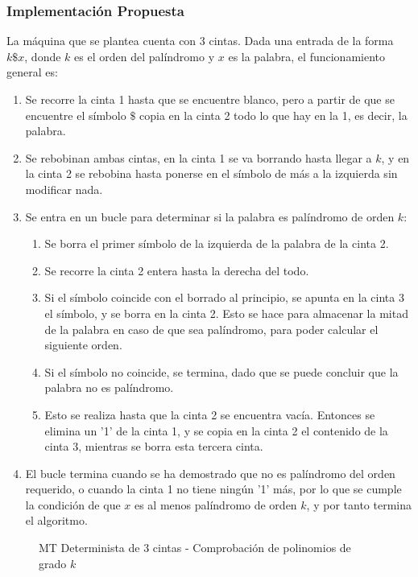 \documentclass{uc3mpracticas}
\begin{document}
  \subsubsection{Implementación Propuesta}

  La máquina que se plantea cuenta con 3 cintas. Dada una entrada de la forma $ k\$x $, donde $k$ es el orden del palíndromo y $x$ es la palabra, el funcionamiento general es:
    \begin{enumerate}
      \item Se recorre la cinta 1 hasta que se encuentre blanco, pero a partir de que se encuentre el símbolo $\$$ copia en la cinta 2 todo lo que hay en la 1, es decir, la palabra.
      \item Se rebobinan ambas cintas, en la cinta 1 se va borrando hasta llegar a $k$, y en la cinta 2 se rebobina hasta ponerse en el símbolo de más a la izquierda sin modificar nada.
      \item Se entra en un bucle para determinar si la palabra es palíndromo de orden $k$:
      \begin{enumerate}
        \item Se borra el primer símbolo de la izquierda de la palabra de la cinta 2.
        \item Se recorre la cinta 2 entera hasta la derecha del todo.
        \item Si el símbolo coincide con el borrado al principio, se apunta en la cinta 3 el símbolo, y se borra en la cinta 2. Esto se hace para almacenar la mitad de la palabra en caso de que sea palíndromo, para poder calcular el siguiente orden.
        \item Si el símbolo no coincide, se termina, dado que se puede concluir que la palabra no es palíndromo.
        \item Esto se realiza hasta que la cinta 2 se encuentra vacía. Entonces se elimina un '1' de la cinta 1, y se copia en la cinta 2 el contenido de la cinta 3, mientras se borra esta tercera cinta.
      \end{enumerate}
      \item El bucle termina cuando se ha demostrado que no es palíndromo del orden requerido, o cuando la cinta 1 no tiene ningún '1' más, por lo que se cumple la condición de que $x$ es al menos palíndromo de orden $k$, y por tanto termina el algoritmo.
    \end{enumerate}

    \begin{figure}[!h]
      \caption{MT Determinista de 3 cintas - Comprobación de polinomios de grado $k$}
    \end{figure}
\end{document}
